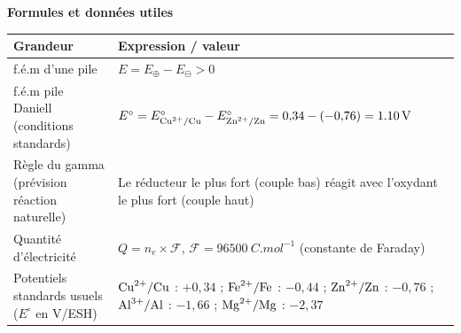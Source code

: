 \documentclass[11pt]{article}
\begin{document}
\begin{aretenir}
\textbf{Formules et données utiles}
\begin{center}
\begin{tabularx}{\linewidth}{|l|X|}
\hline
\rowcolor{popblueL} \textbf{Grandeur} & \textbf{Expression / valeur} \\
\hline
f.é.m d'une pile & $E = E_{\oplus} - E_{\ominus} > 0$ \\
\hline
f.é.m pile Daniell (conditions standards) & $E^\circ = E^\circ_{\ce{Cu^2+}/\ce{Cu}} - E^\circ_{\ce{Zn^2+}/\ce{Zn}} = 0{,}34 - (-0{,}76) = \SI{1,10}{V}$ \\
\hline
Règle du gamma (prévision réaction naturelle) & Le réducteur le plus fort (couple bas) réagit avec l'oxydant le plus fort (couple haut) \\
\hline
Quantité d'électricité & $Q = n_e \times \mathcal{F}$, $\mathcal{F} = \SI{96500}{C.mol^{-1}}$ (constante de Faraday) \\
\hline
Potentiels standards usuels ($E^\circ$ en V/ESH) & 
$\ce{Cu^2+}/\ce{Cu}$ : $+0{,}34$ ; 
$\ce{Fe^2+}/\ce{Fe}$ : $-0{,}44$ ; 
$\ce{Zn^2+}/\ce{Zn}$ : $-0{,}76$ ; 
$\ce{Al^3+}/\ce{Al}$ : $-1{,}66$ ; 
$\ce{Mg^2+}/\ce{Mg}$ : $-2{,}37$ \\
\hline
\end{tabularx}
\end{center}


\end{aretenir}
\end{document}
